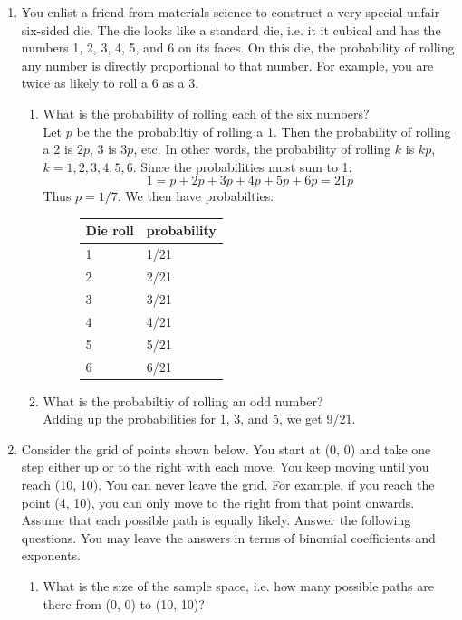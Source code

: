 \documentclass[12pt]{article}
\begin{document}
\begin{enumerate}
\item You enlist a friend from materials science to construct a very special unfair six-sided die. The die looks like a standard die, i.e. it it cubical and has the numbers 1, 2, 3, 4, 5, and 6 on its faces. On this die, the probability of rolling any number is directly proportional to that number. For example, you are twice as likely to roll a 6 as a 3. 
\begin{enumerate}
\item What is the probability of rolling each of the six numbers?\\
Let $p$ be the the probabiltiy of rolling a 1. Then the probability of rolling a 2 is $2p$, 3 is $3p$, etc. In other words, the probability of rolling $k$ is $kp$, $k = 1, 2, 3, 4, 5, 6$. Since the probabilities must sum to 1:
\[
1 = p + 2p + 3p + 4p + 5p + 6p = 21p
\]
Thus $p = 1/7$. We then have probabilties:
\begin{figure}[H]
\centering
\begin{tabular}{l@{\hskip 2cm}l}
\toprule
Die roll & probability\\
\midrule
1 & 1/21\\
2 & 2/21\\
3 & 3/21\\
4 & 4/21\\
5 & 5/21\\
6 & 6/21\\
\bottomrule
\end{tabular}
\end{figure}

\item What is the probabiltiy of rolling an odd number?\\
Adding up the probabilities for 1, 3, and 5, we get 9/21.

\end{enumerate}

\item Consider the grid of points shown below. You start at (0, 0) and take one step either up or to the right with each move. You keep moving until you reach (10, 10). You can never leave the grid. For example, if you reach the point (4, 10), you can only move to the right from that point onwards. Assume that each possible path is equally likely. Answer the following questions. You may leave the answers in terms of binomial coefficients and exponents.
\begin{enumerate}
\item What is the size of the sample space, i.e. how many possible paths are there from (0, 0) to (10, 10)?\\


\end{enumerate}
\end{enumerate}
\end{document}
